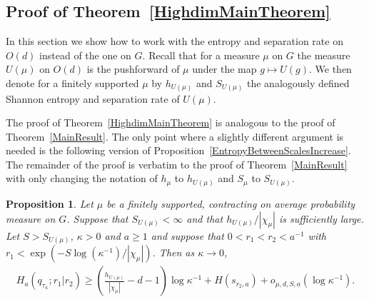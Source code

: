 \documentclass[10pt, english,oneside,reqno]{amsart}
\theoremstyle{plain}
\newtheorem{proposition}[theorem]{Proposition}
\theoremstyle{remark}
\numberwithin{equation}{section}
\numberwithin{figure}{section}
\begin{document}
\subsection{Proof of Theorem~\ref{HighdimMainTheorem}} \label{subsection:HighDimMain}

In this section we show how to work with the entropy and separation rate on $O(d)$ instead of the one on $G$. Recall that for a measure $\mu$ on $G$ the measure $U(\mu)$ on $O(d)$ is the pushforward of $\mu$ under the map $g \mapsto U(g)$. We then denote for a finitely supported $\mu$ by $h_{U(\mu)}$ and $S_{U(\mu)}$ the analogously defined Shannon entropy and separation rate of $U(\mu)$. 

The proof of Theorem~\ref{HighdimMainTheorem} is analogous to the proof of Theorem~\ref{MainResult}. The only point where a slightly different argument is needed is the following version of Proposition~\ref{EntropyBetweenScalesIncrease}. The remainder of the proof is verbatim to the proof of Theorem~\ref{MainResult} with only changing the notation of $h_{\mu}$ to $h_{U(\mu)}$ and $S_{\mu}$ to $S_{U(\mu)}$.

\begin{proposition}\label{UEntropyBetweenScalesIncrease}
    Let $\mu$ be a finitely supported, contracting on average probability measure on $G$.  Suppose that $S_{U(\mu)} < \infty$ and  that $h_{U(\mu)}/|\chi_{\mu}|$ is sufficiently large. Let $S > S_{U(\mu)}$, $\kappa > 0$ and $a \geq 1$ and suppose that $0 < r_1 < r_2 < a^{-1}$ with $r_1 < \exp( -S \log(\kappa^{-1})/|\chi_{\mu}|)$. Then as $\kappa \to 0$,
    \begin{align*}
          H_a(q_{\tau_{\kappa}}; r_1|r_2) \geq \left( \frac{h_{U(\mu)}}{|\chi_{\mu}|} - d -1 \right) \log \kappa^{-1} + H(s_{r_2,a}) + o_{\mu,d,S,a}(\log \kappa^{-1}).
    \end{align*}
\end{proposition}
\end{document}

